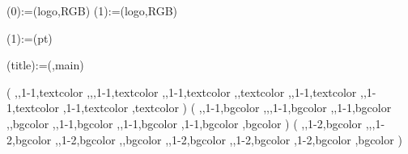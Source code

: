 \makeatletter

\newcommand{\myspinewidth}{13mm}
\newcommand{\umfonta}{\fontsize{14.55}{14.55}\selectfont}
\newcommand{\umfontb}{\fontsize{17}{17}\selectfont}
\newcommand{\umfontc}{\fontsize{10}{10}\selectfont}

\logo(0):={\theuniversity(logo,RGB)}
\logo(1):={\theschool(logo,RGB)}

\school(1):={\theschool(pt)}

\spine(title):={\thedoctitle(\@LANG@COVER,main)}

(%
            {\@DOCTYPE,\@DEGREEACR,1-1,textcolor}%
           ,{\@DOCCLASS,\@DEGREEACR,1-1,textcolor}%
           ,{\@DEGREEACR,1-1,textcolor}%
           ,{\@DEGREEACR,textcolor}%
           ,{\@DOCTYPE,1-1,textcolor}%
           ,{\@DOCCLASS,1-1,textcolor}%
           ,{1-1,textcolor}%
           ,{textcolor}%
){\color{\match}}{}%
(%
            {\@DOCTYPE,\@DEGREEACR,1-1,bgcolor}%
           ,{\@DOCCLASS,\@DEGREEACR,1-1,bgcolor}%
           ,{\@DEGREEACR,1-1,bgcolor}%
           ,{\@DEGREEACR,bgcolor}%
           ,{\@DOCTYPE,1-1,bgcolor}%
           ,{\@DOCCLASS,1-1,bgcolor}%
           ,{1-1,bgcolor}%
           ,{bgcolor}%
)%
(%
            {\@DOCTYPE,\@DEGREEACR,1-2,bgcolor}%
           ,{\@DOCCLASS,\@DEGREEACR,1-2,bgcolor}%
           ,{\@DEGREEACR,1-2,bgcolor}%
           ,{\@DEGREEACR,bgcolor}%
           ,{\@DOCTYPE,1-2,bgcolor}%
           ,{\@DOCCLASS,1-2,bgcolor}%
           ,{1-2,bgcolor}%
           ,{bgcolor}%
)%

